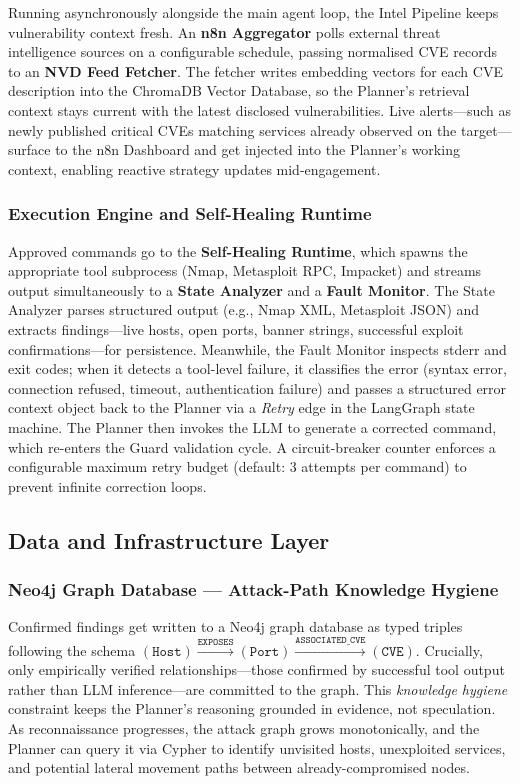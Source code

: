 \documentclass[conference]{IEEEtran}
\begin{document}
Running asynchronously alongside the main agent loop, the Intel Pipeline keeps vulnerability context fresh. An \textbf{n8n Aggregator} polls external threat intelligence sources on a configurable schedule, passing normalised CVE records to an \textbf{NVD Feed Fetcher}. The fetcher writes embedding vectors for each CVE description into the ChromaDB Vector Database, so the Planner's retrieval context stays current with the latest disclosed vulnerabilities. Live alerts---such as newly published critical CVEs matching services already observed on the target---surface to the n8n Dashboard and get injected into the Planner's working context, enabling reactive strategy updates mid-engagement.

\subsubsection{Execution Engine and Self-Healing Runtime}

Approved commands go to the \textbf{Self-Healing Runtime}, which spawns the appropriate tool subprocess (Nmap, Metasploit RPC, Impacket) and streams output simultaneously to a \textbf{State Analyzer} and a \textbf{Fault Monitor}. The State Analyzer parses structured output (e.g., Nmap XML, Metasploit JSON) and extracts findings---live hosts, open ports, banner strings, successful exploit confirmations---for persistence. Meanwhile, the Fault Monitor inspects stderr and exit codes; when it detects a tool-level failure, it classifies the error (syntax error, connection refused, timeout, authentication failure) and passes a structured error context object back to the Planner via a \textit{Retry} edge in the LangGraph state machine. The Planner then invokes the LLM to generate a corrected command, which re-enters the Guard validation cycle. A circuit-breaker counter enforces a configurable maximum retry budget (default: 3 attempts per command) to prevent infinite correction loops.

\subsection{Data and Infrastructure Layer}

\subsubsection{Neo4j Graph Database --- Attack-Path Knowledge Hygiene}

Confirmed findings get written to a Neo4j graph database as typed triples following the schema \mbox{$(\texttt{Host}) \xrightarrow{\texttt{EXPOSES}} (\texttt{Port}) \xrightarrow{\texttt{ASSOCIATED\_CVE}} (\texttt{CVE})$}. Crucially, only empirically verified relationships---those confirmed by successful tool output rather than LLM inference---are committed to the graph. This \textit{knowledge hygiene} constraint keeps the Planner's reasoning grounded in evidence, not speculation. As reconnaissance progresses, the attack graph grows monotonically, and the Planner can query it via Cypher to identify unvisited hosts, unexploited services, and potential lateral movement paths between already-compromised nodes.
\end{document}
